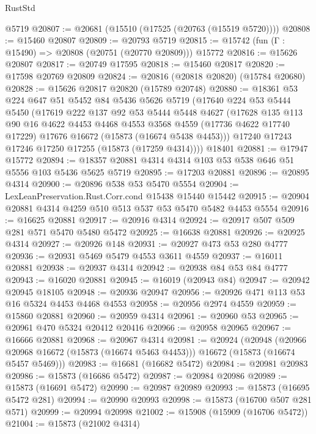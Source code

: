 \begin{lexlean}{RustStd}
\begin{coremodule}
    @5719
@20807 := @20681 (@15510 (@17525 (@20763 (@15519 @5720))))
@20808 := @15460 @20807
@20809 := @20793 @5719
@20815 := @15742 (fun (Γ : @15490) => @20808 (@20751 (@20770 @20809))) @15772
@20816 := @15626 @20807
@20817 := @20749 @17595
@20818 := @15460 @20817
@20820 := @17598 @20769 @20809
@20824 := @20816 (@20818 @20820) (@15784 @20680)
@20828 := @15626 @20817 @20820 (@15789 @20748)
@20880 := @18361
    @53
    @224
    @647
    @51
    @5452
    @84
    @5436
    @5626
    @5719
    (@17640
      @224
      @53
      @5444
      @5450
      (@17619
        @222
        @137
        @92
        @53
        @5444
        @5448
        @4627
        (@17628
          @135
          @113
          @90
          @16
          @4622
          @4453
          @4468
          @4553
          @3568
          @4559
          (@17736 @4622 @17740 @17229)
          @17676
          @16672
          (@15873 (@16674 @5438 @4453)))
        @17240
        @17243
        @17246
        @17250
        @17255
        (@15873 (@17259 @4314))))
    @18401
@20881 := @17947 @15772
@20894 := @18357 @20881 @4314 @4314 @103 @53 @538 @646 @51 @5556 @103 @5436 @5625 @5719
@20895 := @17203 @20881
@20896 := @20895 @4314
@20900 := @20896 @538 @53 @5470 @5554
@20904 := LexLeanPreservation.Rust.Corr.cond @15438 @15440 @15442
@20915 := @20904 @20881 @4314 @4259 @510 @513 @537 @53 @5470 @5482 @4453 @5554
@20916 := @16625 @20881
@20917 := @20916 @4314
@20924 := @20917 @507 @509 @281 @571 @5470 @5480 @5472
@20925 := @16638 @20881
@20926 := @20925 @4314
@20927 := @20926 @148
@20931 := @20927 @473 @53 @280 @4777
@20936 := @20931 @5469 @5479 @4553 @3611 @4559
@20937 := @16011 @20881
@20938 := @20937 @4314
@20942 := @20938 @84 @53 @84 @4777
@20943 := @16020 @20881
@20945 := @16019 (@20943 @84)
@20947 := @20942 @20945 @18105
@20948 := @20936 @20947
@20956 := @20926 @471 @113 @53 @16 @5324 @4453 @4468 @4553
@20958 := @20956 @2974 @4559
@20959 := @15860 @20881
@20960 := @20959 @4314
@20961 := @20960 @53
@20965 := @20961 @470 @5324 @20412 @20416
@20966 := @20958 @20965
@20967 := @16666 @20881
@20968 := @20967 @4314
@20981 := @20924
    (@20948
      (@20966 @20968 @16672 (@15873 (@16674 @5463 @4453)))
      @16672
      (@15873 (@16674 @5457 @5469)))
@20983 := @16681 (@16682 @5472)
@20984 := @20981 @20983
@20986 := @15873 (@16686 @5472)
@20987 := @20984 @20986
@20989 := @15873 (@16691 @5472)
@20990 := @20987 @20989
@20993 := @15873 (@16695 @5472 @281)
@20994 := @20990 @20993
@20998 := @15873 (@16700 @507 @281 @571)
@20999 := @20994 @20998
@21002 := @15908 (@15909 (@16706 @5472))
@21004 := @15873 (@21002 @4314)

\end{coremodule}
\end{lexlean}
